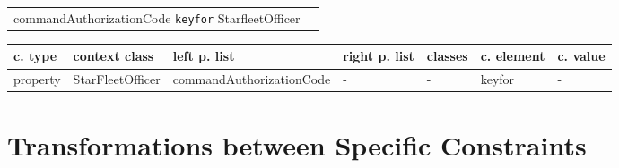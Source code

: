 \documentclass{llncs}
\newcommand{\ms}[1]{\texttt{#1}}
\newenvironment{gcotable}{
  \scriptsize
  \sffamily
  \vspace{0cm}
	\begin{center}
  \begin{tabular}{l|l|l|l|l|l|l}
  \hline
  \textbf{c. type} & \textbf{context class} & \textbf{left p. list} & \textbf{right p. list} & \textbf{classes} & \textbf{c. element} & \textbf{c. value} \\
  \hline

}{
  \hline
  \end{tabular}
	\end{center}
}
\newenvironment{DL}{
  \vspace{0cm}
	\begin{center}
  \begin{tabular}{r l}

}{
  \end{tabular}
	\end{center}
}
\begin{document}
\begin{DL}
commandAuthorizationCode \ms{keyfor} StarfleetOfficer
\end{DL}

\begin{gcotable}
property & StarFleetOfficer & commandAuthorizationCode & - & - & keyfor & - \\
\end{gcotable}


%
%
%

\section{Transformations between Specific Constraints}
\label{sec:transformations}
\end{document}
